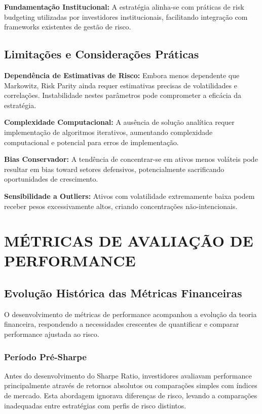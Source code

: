 \textbf{Fundamentação Institucional:} A estratégia alinha-se com práticas de risk budgeting utilizadas por investidores institucionais, facilitando integração com frameworks existentes de gestão de risco.

\subsection{Limitações e Considerações Práticas}

\textbf{Dependência de Estimativas de Risco:} Embora menos dependente que Markowitz, Risk Parity ainda requer estimativas precisas de volatilidades e correlações. Instabilidade nestes parâmetros pode comprometer a eficácia da estratégia.

\textbf{Complexidade Computacional:} A ausência de solução analítica requer implementação de algoritmos iterativos, aumentando complexidade computacional e potencial para erros de implementação.

\textbf{Bias Conservador:} A tendência de concentrar-se em ativos menos voláteis pode resultar em bias toward setores defensivos, potencialmente sacrificando oportunidades de crescimento.

\textbf{Sensibilidade a Outliers:} Ativos com volatilidade extremamente baixa podem receber pesos excessivamente altos, criando concentrações não-intencionais.

\section{MÉTRICAS DE AVALIAÇÃO DE PERFORMANCE}

\subsection{Evolução Histórica das Métricas Financeiras}

O desenvolvimento de métricas de performance acompanhou a evolução da teoria financeira, respondendo a necessidades crescentes de quantificar e comparar performance ajustada ao risco.

\subsubsection{Período Pré-Sharpe}

Antes do desenvolvimento do Sharpe Ratio, investidores avaliavam performance principalmente através de retornos absolutos ou comparações simples com índices de mercado. Esta abordagem ignorava diferenças de risco, levando a comparações inadequadas entre estratégias com perfis de risco distintos.

